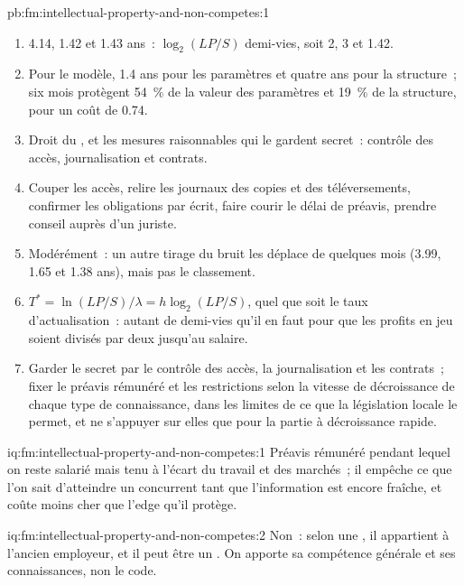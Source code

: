 \begin{solution}{pb:fm:intellectual-property-and-non-competes:1}
\begin{enumerate}
\item 4.14, 1.42 et 1.43 ans~: $\log_2(LP/S)$ demi-vies, soit 2, 3 et 1.42.
\item Pour le modèle, 1.4 ans pour les paramètres et quatre ans pour la structure~; six mois protègent 54~\% de la valeur des paramètres et 19~\% de la
structure, pour un coût de 0.74.
\item Droit du , et les mesures raisonnables qui le gardent secret~: contrôle des accès, journalisation et contrats.
\item Couper les accès, relire les journaux des copies et des téléversements, confirmer les obligations par écrit, faire courir le délai de préavis, prendre conseil auprès d'un juriste.
\item Modérément~: un autre tirage du bruit les déplace de quelques mois (3.99, 1.65 et 1.38 ans), mais pas le classement.
\item $T^*=\ln(LP/S)/\lambda=h\log_2(LP/S)$, quel que soit le taux d'actualisation~: autant de demi-vies qu'il en faut pour que les profits en jeu soient divisés par deux jusqu'au
salaire.
\item Garder le secret par le contrôle des accès, la journalisation et les contrats~; fixer le préavis rémunéré et les restrictions selon la vitesse de décroissance de chaque type de connaissance, dans les limites de ce que
la législation locale le permet, et ne s'appuyer sur elles que pour la partie à décroissance rapide.
\end{enumerate}
\end{solution}

\begin{solution}{iq:fm:intellectual-property-and-non-competes:1}
Préavis rémunéré pendant lequel on reste salarié mais tenu à l'écart du travail et des marchés~; il empêche ce que l'on sait d'atteindre un concurrent tant que
l'information est encore fraîche, et coûte moins cher que l'edge qu'il protège.
\end{solution}

\begin{solution}{iq:fm:intellectual-property-and-non-competes:2}
Non~: selon une , il appartient à l'ancien employeur, et il peut être un . On apporte sa compétence générale et
ses connaissances, non le code.
\end{solution}

